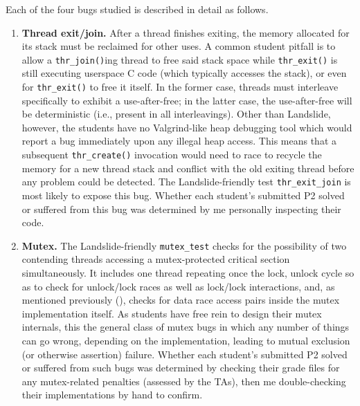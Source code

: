 Each of the four bugs studied is described in detail as follows.

\begin{enumerate}
\item
{\bf Thread exit/join.}
After a thread finishes exiting, the memory allocated for its stack must be reclaimed for other uses.
A common student pitfall is to allow a {\tt thr\_join()}ing thread to free said stack space
while {\tt thr\_exit()} is still executing userspace C code (which typically accesses the stack),
or even for {\tt thr\_exit()} to free it itself.
In the former case, threads must interleave specifically to exhibit a use-after-free;
in the latter case, the use-after-free will be deterministic (i.e., present in all interleavings).
Other than Landslide, however,
the students have no Valgrind-like heap debugging tool which would report a bug immediately upon any illegal heap access.
This means that a subsequent {\tt thr\_create()} invocation would need to race to recycle the memory for a new thread stack
and conflict with the old exiting thread
before any problem could be detected.
The Landslide-friendly test {\tt thr\_exit\_join} is most likely to expose this bug.
Whether each student's submitted P2 solved or suffered from this bug
was determined by me personally inspecting their code.
%

\item
{\bf Mutex.}
The Landslide-friendly {\tt mutex\_test} checks for the possibility of two contending threads
accessing a mutex-protected critical section simultaneously.
It includes one thread repeating once the lock, unlock cycle
so as to check for unlock/lock races as well as lock/lock interactions,
and, as mentioned previously (\sect{\ref{sec:education-pebbles-tests}}),
checks for data race access pairs inside the mutex implementation itself.
As students have free rein to design their mutex internals,
this
the general class of mutex bugs
in which any number of things can go wrong, depending on the implementation,
leading to mutual exclusion (or otherwise assertion) failure.
Whether each student's submitted P2 solved or suffered from such bugs
was determined by checking their grade files for any mutex-related penalties (assessed by the TAs),
then me double-checking their implementations by hand to confirm.


\end{enumerate}
